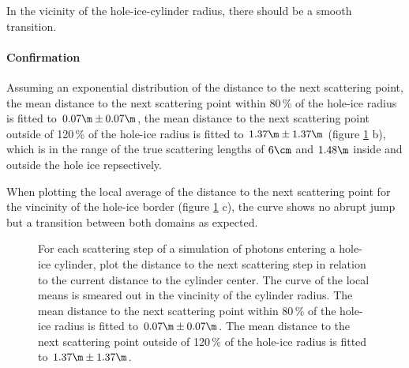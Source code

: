 In the vicinity of the hole-ice-cylinder radius, there should be a smooth transition. 

\paragraph{Confirmation}
Assuming an exponential distribution of the distance to the next scattering point, the mean distance to the next scattering point within 80\,\% of the hole-ice radius is fitted to $0.07\m \pm 0.07\m$, the mean distance to the next scattering point outside of 120\,\% of the hole-ice radius is fitted to $1.37\m\pm 1.37\m$ (figure \ref{fig:eeYoid2p} b), which is in the range of the true scattering lengths of $6\cm$ and $1.48\m$ inside and outside the hole ice repsectively.

When plotting the local average of the distance to the next scattering point for the vincinity of the hole-ice border (figure \ref{fig:eeYoid2p} c), the curve shows no abrupt jump but a transition between both domains as expected.

\begin{figure}[htbp]
  \hfill
  \hfill
  \caption{For each scattering step of a simulation of photons entering a hole-ice cylinder, plot the distance to the next scattering step in relation to the current distance to the cylinder center. The curve of the local means is smeared out in the vincinity of the cylinder radius. The mean distance to the next scattering point within 80\,\% of the hole-ice radius is fitted to $0.07\m \pm 0.07\m$. The mean distance to the next scattering point outside of 120\,\% of the hole-ice radius is fitted to $1.37\m\pm 1.37\m$. }
  \label{fig:eeYoid2p}
\end{figure}

